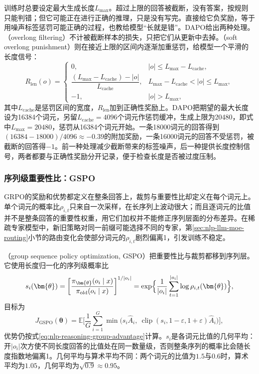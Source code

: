 训练时总要设定最大生成长度$L_{\max}$。超过上限的回答被截断，没有答案，按规则只能判错；但它可能正在进行正确的推理，只是没有写完。直接给它负奖励，等于用噪声标签惩罚可能正确的过程，也教给模型“长就是错”。DAPO给出两种处理。（overlong filtering）不计被截断样本的损失，只把它们从更新中去掉。（soft overlong punishment）则在接近上限的区间内逐渐加重惩罚，给模型一个平滑的长度信号：
\begin{equation}
  R_{\mathrm{len}}(o)=
  \begin{cases}
    0, & |o|\le L_{\max}-L_{\mathrm{cache}},\\[2pt]
    \dfrac{(L_{\max}-L_{\mathrm{cache}})-|o|}{L_{\mathrm{cache}}}, & L_{\max}-L_{\mathrm{cache}}<|o|\le L_{\max},\\[6pt]
    -1, & |o|>L_{\max},
  \end{cases}
  \label{eq:nlp-reasoning-soft-overlong}
\end{equation}
其中$L_{\mathrm{cache}}$是惩罚区间的宽度，$R_{\mathrm{len}}$加到正确性奖励上。DAPO把期望的最大长度设为16384个词元，另留$L_{\mathrm{cache}}=4096$个词元作惩罚缓冲，生成上限为20480，即式中$L_{\max}=20480$，惩罚从16384个词元开始。一条18000词元的回答得到$(16384-18000)/4096\approx-0.39$的附加奖励，一条16000词元的回答不受惩罚，被截断的回答得$-1$。前一种处理减少截断带来的标签噪声，后一种提供长度控制信号，两者都要与正确性奖励分开记录，便于检查长度是否被过度压制。

\subsubsection{序列级重要性比：GSPO}
\label{sec:nlp-reasoning-gspo}

GRPO的奖励和优势都定义在整条回答上，裁剪与重要性比却定义在每个词元上。单个词元的概率比$\rho_{i,t}$只来自一次采样，在长序列上波动很大；而且逐词元的比值并不是整条回答的重要性权重，用它们加权并不能修正序列层面的分布差异。在稀疏专家模型中，新旧策略对同一前缀可能选择不同的专家，第\ref{sec:nlp-llm-moe-routing}小节的路由变化会使部分词元的$\rho_{i,t}$剧烈偏离1，引发训练不稳定。

（group sequence policy optimization, GSPO）把重要性比与裁剪都移到序列层。它使用长度归一化的序列级概率比
\begin{equation}
  s_i(\bm{\theta})=
  \left[\frac{\pi_{\bm{\theta}}(o_i\mid x)}{\pi_{\mathrm{old}}(o_i\mid x)}\right]^{1/|o_i|}
  =\exp\Bigl\{\frac1{|o_i|}\sum_{t=1}^{|o_i|}\log\rho_{i,t}(\bm{\theta})\Bigr\},
  \label{eq:nlp-reasoning-gspo-ratio}
\end{equation}
目标为
\[
  J_{\mathrm{GSPO}}(\bm\theta)=\mathbb E\Biggl[\frac1G\sum_{i=1}^{G}\min\bigl(s_i\widehat A_i,\ \operatorname{clip}(s_i,1-\varepsilon,1+\varepsilon)\widehat A_i\bigr)\Biggr],
\]
优势仍按式\eqref{eq:nlp-reasoning-group-advantage}计算。$s_i$是各词元比值的几何平均：开$|o_i|$次方使不同长度回答的比值处在同一数量级，否则整条序列的概率比会随长度指数地偏离1。几何平均与算术平均不同：两个词元的比值为$1.5$与$0.6$时，算术平均为$1.05$，几何平均为$\sqrt{0.9}\approx0.95$。

